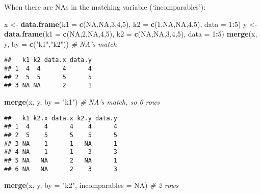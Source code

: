 \documentclass[]{book}
\newenvironment{Shaded}{\begin{snugshade}}{\end{snugshade}}
\newcommand{\KeywordTok}[1]{\textcolor[rgb]{0.13,0.29,0.53}{\textbf{#1}}}
\newcommand{\DataTypeTok}[1]{\textcolor[rgb]{0.13,0.29,0.53}{#1}}
\newcommand{\DecValTok}[1]{\textcolor[rgb]{0.00,0.00,0.81}{#1}}
\newcommand{\StringTok}[1]{\textcolor[rgb]{0.31,0.60,0.02}{#1}}
\newcommand{\CommentTok}[1]{\textcolor[rgb]{0.56,0.35,0.01}{\textit{#1}}}
\newcommand{\OtherTok}[1]{\textcolor[rgb]{0.56,0.35,0.01}{#1}}
\newcommand{\OperatorTok}[1]{\textcolor[rgb]{0.81,0.36,0.00}{\textbf{#1}}}
\newcommand{\NormalTok}[1]{#1}
\theoremstyle{definition}
\theoremstyle{definition}
\theoremstyle{definition}
\theoremstyle{remark}
\begin{document}
When there are NAs in the matching variable (`incomparables'):

\begin{Shaded}
\begin{Highlighting}[]
\NormalTok{x <-}\StringTok{ }\KeywordTok{data.frame}\NormalTok{(}\DataTypeTok{k1 =} \KeywordTok{c}\NormalTok{(}\OtherTok{NA}\NormalTok{,}\OtherTok{NA}\NormalTok{,}\DecValTok{3}\NormalTok{,}\DecValTok{4}\NormalTok{,}\DecValTok{5}\NormalTok{), }\DataTypeTok{k2 =} \KeywordTok{c}\NormalTok{(}\DecValTok{1}\NormalTok{,}\OtherTok{NA}\NormalTok{,}\OtherTok{NA}\NormalTok{,}\DecValTok{4}\NormalTok{,}\DecValTok{5}\NormalTok{), }\DataTypeTok{data =} \DecValTok{1}\OperatorTok{:}\DecValTok{5}\NormalTok{)}
\NormalTok{y <-}\StringTok{ }\KeywordTok{data.frame}\NormalTok{(}\DataTypeTok{k1 =} \KeywordTok{c}\NormalTok{(}\OtherTok{NA}\NormalTok{,}\DecValTok{2}\NormalTok{,}\OtherTok{NA}\NormalTok{,}\DecValTok{4}\NormalTok{,}\DecValTok{5}\NormalTok{), }\DataTypeTok{k2 =} \KeywordTok{c}\NormalTok{(}\OtherTok{NA}\NormalTok{,}\OtherTok{NA}\NormalTok{,}\DecValTok{3}\NormalTok{,}\DecValTok{4}\NormalTok{,}\DecValTok{5}\NormalTok{), }\DataTypeTok{data =} \DecValTok{1}\OperatorTok{:}\DecValTok{5}\NormalTok{)}
\KeywordTok{merge}\NormalTok{(x, y, }\DataTypeTok{by =} \KeywordTok{c}\NormalTok{(}\StringTok{"k1"}\NormalTok{,}\StringTok{"k2"}\NormalTok{)) }\CommentTok{# NA's match}
\end{Highlighting}
\end{Shaded}

\begin{verbatim}
##   k1 k2 data.x data.y
## 1  4  4      4      4
## 2  5  5      5      5
## 3 NA NA      2      1
\end{verbatim}

\begin{Shaded}
\begin{Highlighting}[]
\KeywordTok{merge}\NormalTok{(x, y, }\DataTypeTok{by =} \StringTok{"k1"}\NormalTok{) }\CommentTok{# NA's match, so 6 rows}
\end{Highlighting}
\end{Shaded}

\begin{verbatim}
##   k1 k2.x data.x k2.y data.y
## 1  4    4      4    4      4
## 2  5    5      5    5      5
## 3 NA    1      1   NA      1
## 4 NA    1      1    3      3
## 5 NA   NA      2   NA      1
## 6 NA   NA      2    3      3
\end{verbatim}

\begin{Shaded}
\begin{Highlighting}[]
\KeywordTok{merge}\NormalTok{(x, y, }\DataTypeTok{by =} \StringTok{"k2"}\NormalTok{, }\DataTypeTok{incomparables =} \OtherTok{NA}\NormalTok{) }\CommentTok{# 2 rows}
\end{Highlighting}
\end{Shaded}
\end{document}
